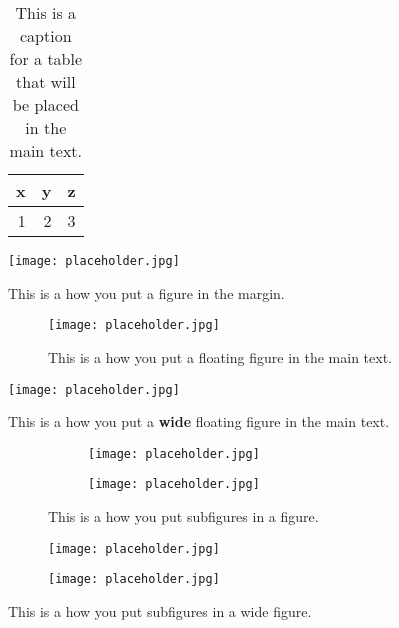 \documentclass[10pt,oneside]{book}
\begin{document}
\begin{table}[bhpt]%
  \centering
  \caption{This is a caption for a table that will be placed in the main text.}
  \label{tab:tableexample}
  \begin{tabular}{rrr}
    \toprule
    x & y & z \\
    \midrule
    1 & 2 & 3 \\
    \bottomrule
  \end{tabular}
\end{table}


\begin{marginfigure}
  \texttt{[image: placeholder.jpg]}
  \caption{This is a how you put a figure in the margin.}
  \label{fig:marginfig}
\end{marginfigure}

\begin{figure}
  \centering
  \texttt{[image: placeholder.jpg]}
  \caption{This is a how you put a floating figure in the main text.}
  \label{fig:floatingfig}
\end{figure}

\begin{widefigure}
  \centering
  \texttt{[image: placeholder.jpg]}
  \caption{This is a how you put a \textbf{wide} floating figure in the main text.}
\end{widefigure}


\begin{figure}
    \centering
    \begin{subfigure}[b]{0.47\linewidth}
      \texttt{[image: placeholder.jpg]}
    \end{subfigure}
    \quad
    \begin{subfigure}[b]{0.47\linewidth}
      \texttt{[image: placeholder.jpg]}
    \end{subfigure}
  \caption{This is a how you put subfigures in a figure.}
\end{figure}


\begin{widefigure}
    \centering
    \begin{subfigure}[b]{0.45\linewidth}
      \texttt{[image: placeholder.jpg]}
    \end{subfigure}
    \qquad
    \begin{subfigure}[b]{0.45\linewidth}
      \texttt{[image: placeholder.jpg]}
    \end{subfigure}
  \caption{This is a how you put subfigures in a wide figure.}
\end{widefigure}
\end{document}
